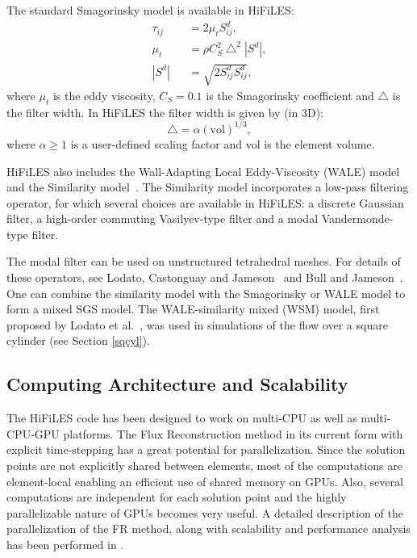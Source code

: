 The standard Smagorinsky model\cite{smagorinsky1963} is available in HiFiLES:
\begin{eqnarray}\label{smag}
\tau_{ij} &&= 2 \mu_t S^d_{ij}, \\
\mu_t &&= \rho C_S^2 \bigtriangleup^2 | S^d |,\\
| S^d | &&= \sqrt{2 S^d_{ij} S^d_{ij}},
\end{eqnarray}
where $\mu_t$ is the eddy viscosity, $C_S = 0.1$ is the Smagorinsky coefficient and $\bigtriangleup$ is the filter width. In HiFiLES the filter width is given by (in 3D):
\begin{equation}
\bigtriangleup = \alpha (\text{vol})^{1/3},
\end{equation}
where $\alpha \geq 1$ is a user-defined scaling factor and vol is the element volume.

HiFiLES also includes the Wall-Adapting Local Eddy-Viscosity (WALE) model~\cite{nicoud1999} and the Similarity model~\cite{bardina1980}.
The Similarity model incorporates a low-pass filtering operator, for which several choices are available in HiFiLES: a discrete Gaussian filter\cite{lodato2012b}, a high-order commuting Vasilyev-type filter\cite{vasilyev1998,vasilyev2001} and a modal Vandermonde-type filter\cite{blackburn2003}.

The modal filter can be used on unstructured tetrahedral meshes. For details of these operators, see Lodato, Castonguay and Jameson~\cite{lodato2012b} and Bull and Jameson~\cite{bull2013a}. One can combine the similarity model with the Smagorinsky or WALE model to form a mixed SGS model. The WALE-similarity mixed (WSM) model, first proposed by Lodato et al.~\cite{lodato2009}, was used in simulations of the flow over a square cylinder (see Section \ref{sqcyl}).

\subsection{Computing Architecture and Scalability}

The HiFiLES code has been designed to work on multi-CPU as well as multi-CPU-GPU platforms. The Flux Reconstruction method in its current form with explicit time-stepping has a great potential for parallelization. Since the solution points are not explicitly shared between elements, most of the computations are element-local enabling an efficient use of shared memory on GPUs. Also, several computations are independent for each solution point and the highly parallelizable nature of GPUs becomes very useful. A detailed description of the parallelization of the FR method, along with scalability and performance analysis has been performed in \cite{castonguay2011}.
